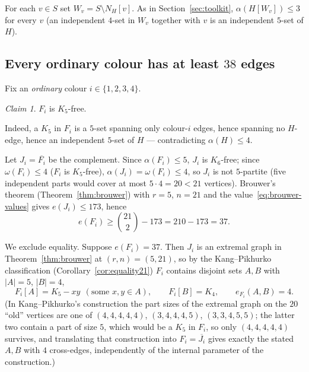 \documentclass[11pt,reqno]{amsart}
\theoremstyle{definition}
\theoremstyle{remark}
\newtheorem*{claim}{Claim}
\newcommand{\abs}[1]{\left|#1\right|}
\begin{document}
For each $v\in S$ set $W_v=S\setminus N_H[v]$. As in Section~\ref{sec:toolkit},
$\alpha(H[W_v])\le 3$ for every $v$ (an independent $4$-set in $W_v$ together with
$v$ is an independent $5$-set of $H$).

\subsection{Every ordinary colour has at least $38$ edges}\label{ssec:MH-Fi}
Fix an \emph{ordinary} colour $i\in\{1,2,3,4\}$.

\begin{claim}
$F_i$ is $K_5$-free.
\end{claim}
Indeed, a $K_5$ in $F_i$ is a $5$-set spanning only colour-$i$ edges, hence
spanning no $H$-edge, hence an independent $5$-set of $H$ --- contradicting
$\alpha(H)\le 4$.

Let $J_i=\overline{F_i}$ be the complement. Since $\alpha(F_i)\le 5$, $J_i$ is
$K_6$-free; since $\omega(F_i)\le 4$ ($F_i$ is $K_5$-free),
$\alpha(J_i)=\omega(F_i)\le 4$, so $J_i$ is not $5$-partite (five independent parts
would cover at most $5\cdot 4=20<21$ vertices). Brouwer's theorem
(Theorem~\ref{thm:brouwer}) with $r=5$, $n=21$ and the value~\eqref{eq:brouwer-values}
gives $e(J_i)\le 173$, hence
\begin{equation}\label{eq:MH-37}
  e(F_i)\ge\binom{21}{2}-173=210-173=37 .
\end{equation}

We exclude equality. Suppose $e(F_i)=37$. Then $J_i$ is an extremal graph in
Theorem~\ref{thm:brouwer} at $(r,n)=(5,21)$, so by the Kang--Pikhurko
classification (Corollary~\ref{cor:equality21}) $F_i$ contains disjoint sets
$A,B$ with $\abs A=5$, $\abs B=4$,
\[
  F_i[A]=K_5-xy\ \ (\text{some }x,y\in A),\qquad F_i[B]=K_4,\qquad e_{F_i}(A,B)=4 .
\]
(In Kang--Pikhurko's construction the part sizes of the extremal graph on the $20$
``old'' vertices are one of $(4,4,4,4,4)$, $(3,4,4,4,5)$, $(3,3,4,5,5)$; the latter
two contain a part of size $5$, which would be a $K_5$ in $F_i$, so only
$(4,4,4,4,4)$ survives, and translating that construction into $F_i=\overline{J_i}$
gives exactly the stated $A,B$ with $4$ cross-edges, independently of the internal
parameter of the construction.)
\end{document}
